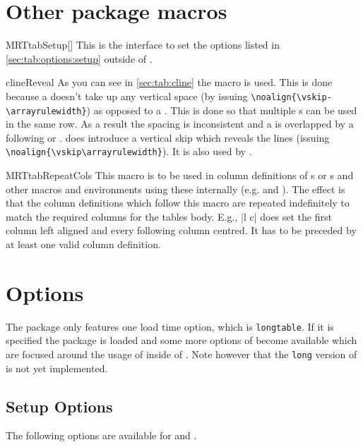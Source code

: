 \section{Other package macros}%
\begin{describemacro}{MRTtabSetup}[]
  This is the interface to set the options listed in
  \autoref{sec:tab:options:setup} outside of .
\end{describemacro}

\begin{describemacro}{clineReveal}
  As you can see in \autoref{sec:tab:cline} the macro  is used.
  This is done because a  doesn't take up any vertical space (by
  issuing \verb|\noalign{\vskip-\arrayrulewidth}|) as opposed to a .
  This is done so that multiple s can be used in the same row. As a
  result the spacing is inconsistent and a  is overlapped by a
  following  or .  does introduce a
  vertical skip which reveals the lines (issuing
  \verb|\noalign{\vskip\arrayrulewidth}|).  It is also used by .
\end{describemacro}

\begin{describemacro}{MRTtabRepeatCols}
  This macro is to be used in column definitions of s or
  s and other macros and environments using these internally (e.g.
   and ). The effect is that the column
  definitions which follow this macro are repeated indefinitely to match the
  required columns for the tables body. E.g., \bverb|l \MRTtabRepeatCols c| does
  set the first column left aligned and every following column centred. It has
  to be preceded by at least one valid column definition.
\end{describemacro}

\section{Options}\label{sec:tab:options}%
The package only features one load time option, which is \texttt{longtable}. If
it is specified the  package is loaded and some more options of
 become available which are focused around the usage of
 inside of . Note however that the \texttt{long}
version of  is not yet implemented.

\subsection{Setup Options}\label{sec:tab:options:setup}
The following options are available for  and .

